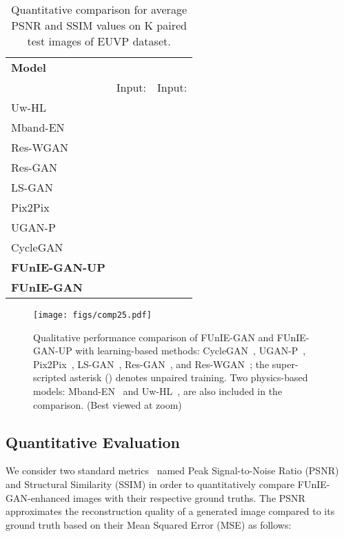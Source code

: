 \documentclass[10pt,twocolumn,letterpaper]{article}
\begin{document}
\begin{table}[b]
\centering
\caption{Quantitative comparison for average PSNR and SSIM values on K paired test images of EUVP dataset.}
\scriptsize
\vspace{-1mm}
\begin{tabular}{l||c|c}
  \hline
  \textbf{Model} &  &  \\  
   & Input:  & Input:   \\ \hline \hline
  Uw-HL &   &    \\ \hline 
  Mband-EN &   &   \\ \hline
  Res-WGAN &  &  \\ \hline
  Res-GAN &  &  \\ \hline
  LS-GAN &  &  \\ \hline
  Pix2Pix &  &  \\ \hline
  UGAN-P &  &  \\ \hline
  CycleGAN &  &   \\ \hline
  \textbf{FUnIE-GAN-UP} &  &  \\ \hline
  \textbf{FUnIE-GAN} &  &  \\ \hline
\end{tabular}
\label{tab:psnr_ssim}
\end{table}



\begin{figure*}[t]
	\centering
	\texttt{[image: figs/comp25.pdf]}
\caption{Qualitative performance comparison of FUnIE-GAN and FUnIE-GAN-UP with learning-based methods: CycleGAN~\cite{zhu2017unpaired}, UGAN-P~\cite{fabbri2018enhancing}, Pix2Pix~\cite{isola2017image}, LS-GAN~\cite{mao2017least}, Res-GAN~\cite{li2017perceptual}, and Res-WGAN~\cite{arjovsky2017wasserstein}; the super-scripted asterisk () denotes unpaired training. Two physics-based models: Mband-EN~\cite{cho2018model} and Uw-HL~\cite{berman2018underwater}, are also included in the comparison. (Best viewed at  zoom)}
	\label{fig:comp}
\end{figure*}


\subsection{Quantitative Evaluation}
We consider two standard metrics~\cite{ignatov2017dslr,chen2018deep,hore2010image} named Peak Signal-to-Noise Ratio (PSNR) and Structural Similarity (SSIM) in order to quantitatively compare FUnIE-GAN-enhanced images with their respective ground truths. The PSNR approximates the reconstruction quality of a generated image  compared to its ground truth  based on their Mean Squared Error (MSE) as follows:
\end{document}
